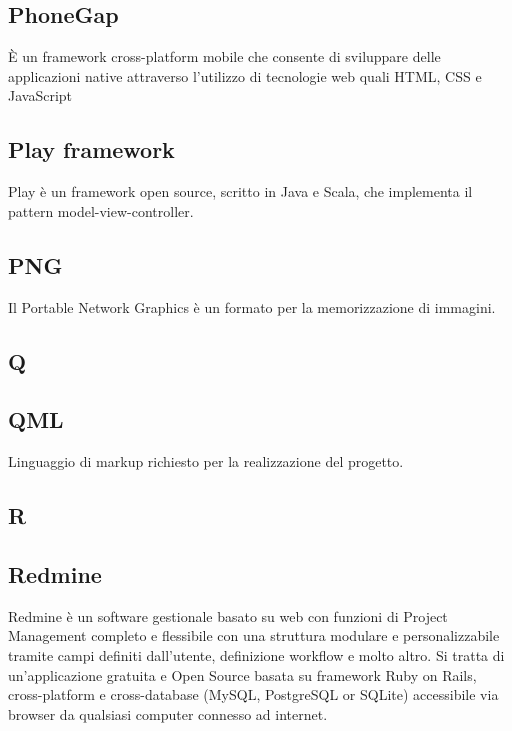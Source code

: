 \subsection*{PhoneGap}
È un framework cross-platform mobile che consente di sviluppare delle applicazioni native attraverso l'utilizzo di tecnologie web quali HTML, CSS e JavaScript

\subsection*{Play framework}
Play è un framework open source, scritto in Java e Scala, che implementa il pattern model-view-controller.

\subsection*{PNG}
Il Portable Network Graphics è un formato per la memorizzazione di immagini.

\newpage

\begin{center}
\Huge\section*{\uppercase{Q}}
\end{center}

\subsection*{QML}
Linguaggio di markup richiesto per la realizzazione del progetto.

\newpage

\begin{center}
\Huge\section*{\uppercase{R}}
\end{center}

\subsection*{Redmine}
Redmine è un software gestionale basato su web con funzioni di Project Management completo e flessibile con una struttura modulare e personalizzabile tramite campi definiti dall'utente, definizione workflow e molto altro.
Si tratta di un'applicazione gratuita e Open Source basata su framework Ruby on Rails, cross-platform e cross-database (MySQL, PostgreSQL or SQLite) accessibile via browser da qualsiasi computer connesso ad internet.

